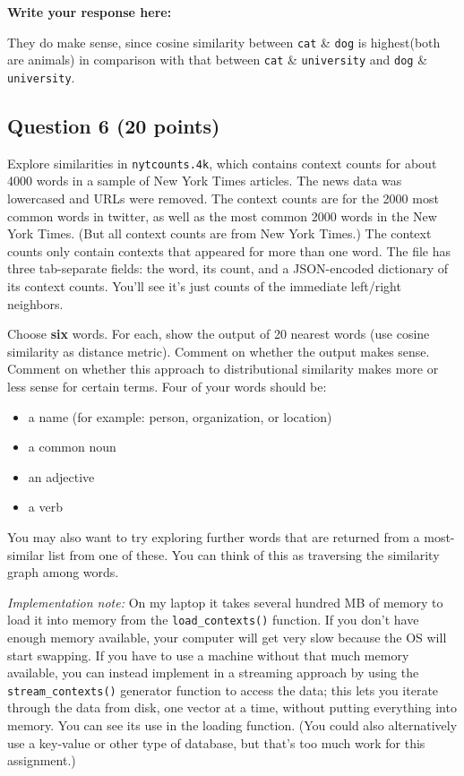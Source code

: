 \documentclass[11pt]{article}
\providecommand{\tightlist}{%
      \setlength{\itemsep}{0pt}\setlength{\parskip}{0pt}}
\begin{document}
    \textbf{Write your response here:}

    They do make sense, since cosine similarity between \texttt{cat} \&
\texttt{dog} is highest(both are animals) in comparison with that
between \texttt{cat} \& \texttt{university} and \texttt{dog} \&
\texttt{university}.

    \subsection{Question 6 (20 points)}\label{question-6-20-points}

Explore similarities in \texttt{nytcounts.4k}, which contains context
counts for about 4000 words in a sample of New York Times articles. The
news data was lowercased and URLs were removed. The context counts are
for the 2000 most common words in twitter, as well as the most common
2000 words in the New York Times. (But all context counts are from New
York Times.) The context counts only contain contexts that appeared for
more than one word. The file has three tab-separate fields: the word,
its count, and a JSON-encoded dictionary of its context counts. You'll
see it's just counts of the immediate left/right neighbors.

Choose \textbf{six} words. For each, show the output of 20 nearest words
(use cosine similarity as distance metric). Comment on whether the
output makes sense. Comment on whether this approach to distributional
similarity makes more or less sense for certain terms. Four of your
words should be:

\begin{itemize}
\tightlist
\item
  a name (for example: person, organization, or location)
\item
  a common noun
\item
  an adjective
\item
  a verb
\end{itemize}

You may also want to try exploring further words that are returned from
a most-similar list from one of these. You can think of this as
traversing the similarity graph among words.

\emph{Implementation note:} On my laptop it takes several hundred MB of
memory to load it into memory from the \texttt{load\_contexts()}
function. If you don't have enough memory available, your computer will
get very slow because the OS will start swapping. If you have to use a
machine without that much memory available, you can instead implement in
a streaming approach by using the \texttt{stream\_contexts()} generator
function to access the data; this lets you iterate through the data from
disk, one vector at a time, without putting everything into memory. You
can see its use in the loading function. (You could also alternatively
use a key-value or other type of database, but that's too much work for
this assignment.)
\end{document}

